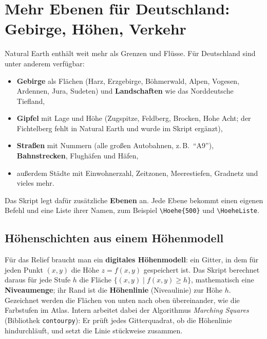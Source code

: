 \section{Mehr Ebenen für Deutschland: Gebirge, Höhen, Verkehr}\label{sec:ebenen}

Natural Earth enthält weit mehr als Grenzen und Flüsse. Für Deutschland sind unter anderem verfügbar:

\begin{itemize}
	\item \textbf{Gebirge} als Flächen (Harz, Erzgebirge, Böhmerwald, Alpen, Vogesen, Ardennen, Jura, Sudeten) und \textbf{Landschaften} wie das Norddeutsche Tiefland,
	\item \textbf{Gipfel} mit Lage und Höhe (Zugspitze, Feldberg, Brocken, Hohe Acht; der Fichtelberg fehlt in Natural Earth und wurde im Skript ergänzt),
	\item \textbf{Straßen} mit Nummern (alle großen Autobahnen, z.\,B.\ \enquote{A9}), \textbf{Bahnstrecken}, Flughäfen und Häfen,
	\item außerdem Städte mit Einwohnerzahl, Zeitzonen, Meerestiefen, Gradnetz und vieles mehr.
\end{itemize}

Das Skript legt dafür zusätzliche \textbf{Ebenen} an. Jede Ebene bekommt einen eigenen Befehl und eine Liste ihrer Namen, zum Beispiel \texttt{\textbackslash Hoehe\{500\}} und \texttt{\textbackslash HoeheListe}.


\subsection{Höhenschichten aus einem Höhenmodell}

Für das Relief braucht man ein \textbf{digitales Höhenmodell}: ein Gitter, in dem für jeden Punkt $(x,y)$ die Höhe $z = f(x,y)$ gespeichert ist. Das Skript berechnet daraus für jede Stufe $h$ die Fläche $\{(x,y) \mid f(x,y) \ge h\}$, mathematisch eine \textbf{Niveaumenge}; ihr Rand ist die \textbf{Höhenlinie} (Niveaulinie) zur Höhe $h$. Gezeichnet werden die Flächen von unten nach oben übereinander, wie die Farbstufen im Atlas. Intern arbeitet dabei der Algorithmus \textit{Marching Squares} (Bibliothek \texttt{contourpy}): Er prüft jedes Gitterquadrat, ob die Höhenlinie hindurchläuft, und setzt die Linie stückweise zusammen.

